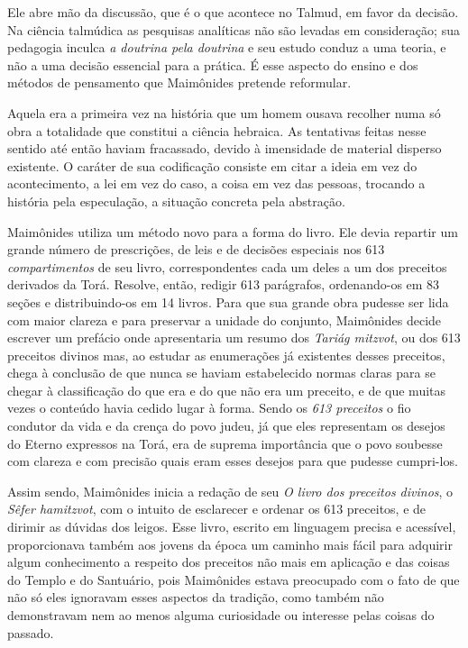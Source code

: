 Ele abre mão da discussão, que é o que acontece no Talmud, em
favor da decisão. Na ciência talmúdica as pesquisas analíticas não são
levadas em consideração; sua pedagogia inculca \emph{a doutrina pela
doutrina} e seu estudo conduz a uma teoria, e não a uma decisão
essencial para a prática. É esse aspecto do ensino e dos métodos de
pensamento que Maimônides pretende reformular.

Aquela era a primeira vez na história que um homem ousava recolher numa
só obra a totalidade que constitui a ciência hebraica. As tentativas
feitas nesse sentido até então haviam fracassado, devido à imensidade de
material disperso existente. O caráter de sua codificação consiste em
citar a ideia em vez do acontecimento, a lei em vez do caso, a coisa em
vez das pessoas, trocando a história pela especulação, a situação
concreta pela abstração.

Maimônides utiliza um método novo para a forma do livro. Ele devia
repartir um grande número de prescrições, de leis e de decisões
especiais nos 613 \emph{compartimentos} de seu livro, correspondentes cada
um deles a um dos preceitos derivados da Torá. Resolve, então,
redigir 613 parágrafos, ordenando-os em 83 seções e distribuindo-os em
14 livros. Para que sua grande obra pudesse ser lida com maior clareza e
para preservar a unidade do conjunto, Maimônides decide escrever um
prefácio onde apresentaria um resumo dos \emph{Tariág mitzvot}, ou dos
613 preceitos divinos mas, ao estudar as enumerações já existentes
desses preceitos, chega à conclusão de que nunca se haviam estabelecido
normas claras para se chegar à classificação do que era e do que não era
um preceito, e de que muitas vezes o conteúdo havia cedido lugar à
forma. Sendo os \emph{613 preceitos} o fio condutor da vida e da crença do
povo judeu, já que eles representam os desejos do Eterno expressos na
Torá, era de suprema importância que o povo soubesse com
clareza e com precisão quais eram esses desejos para que pudesse
cumpri-los.

Assim sendo, Maimônides inicia a redação de seu \emph{O livro dos
preceitos divinos}, o \emph{Sêfer hamitzvot}, com o intuito de esclarecer
e ordenar os 613 preceitos, e de dirimir as dúvidas dos leigos. Esse
livro, escrito em linguagem precisa e acessível, proporcionava também
aos jovens da época um caminho mais fácil para adquirir algum
conhecimento a respeito dos preceitos não mais em aplicação e das coisas
do Templo e do Santuário, pois Maimônides estava preocupado com o fato
de que não só eles ignoravam esses aspectos da tradição, como também
não demonstravam nem ao menos alguma curiosidade ou interesse pelas
coisas do passado.

